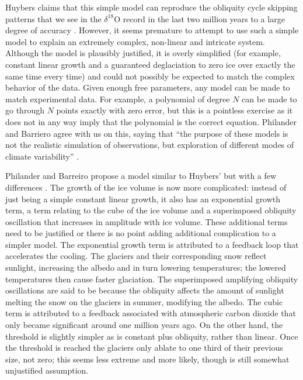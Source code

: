 \documentclass[11pt]{article}
\begin{document}
Huybers claims that this simple model can reproduce the obliquity cycle skipping patterns that we see in the $\delta^{18}$O record in the last two million years to a large degree of accuracy \cite{huybers}.
However, it seems premature to attempt to use such a simple model to explain an extremely complex, non-linear and intricate system.
Although the model is plausibly justified, it is overly simplified (for example, constant linear growth and a guaranteed deglaciation to zero ice over exactly the same time every time) and could not possibly be expected to match the complex behavior of the data.
Given enough free parameters, any model can be made to match experimental data.
For example, a polynomial of degree $N$ can be made to go through $N$ points exactly with zero error, but this is a pointless exercise as it does not in any way imply that the polynomial is the correct equation.
Philander and Barriero agree with us on this, saying that ``the purpose of these models is not the realistic simulation of observations, but exploration of different modes of climate variability'' \cite{philander}.

Philander and Barreiro propose a model similar to Huybers' but with a few differences \cite{philander}.
The growth of the ice volume is now more complicated: instead of just being a simple constant linear growth, it also has an exponential growth term, a term relating to the cube of the ice volume and a superimposed obliquity oscillation that increases in amplitude with ice volume.
These additional terms need to be justified or there is no point adding additional complication to a simpler model.
The exponential growth term is attributed to a feedback loop that accelerates the cooling.
The glaciers and their corresponding snow reflect sunlight, increasing the albedo and in turn lowering temperatures; the lowered temperatures then cause faster glaciation.
The superimposed amplifying obliquity oscillations are said to be because the obliquity affects the amount of sunlight melting the snow on the glaciers in summer, modifying the albedo.
The cubic term is attributed to a feedback associated with atmospheric carbon dioxide that only became significant around one million years ago.
On the other hand, the threshold is slightly simpler as is constant plus obliquity, rather than linear.
Once the threshold is reached the glaciers only ablate to one third of their previous size, not zero; this seems less extreme and more likely, though is still somewhat unjustified assumption.
\end{document}
